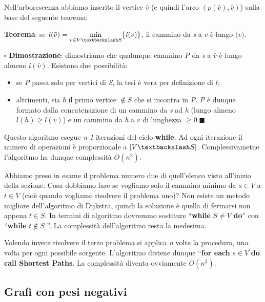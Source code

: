 \documentclass[11pt]{book}
\begin{document}
Nell'arborescenza abbiamo inserito il vertice $\bar{v}$ (e quindi
l'arco $(p(\bar{v}),\bar{v})$) sulla base del seguente teorema:


{\bf Teorema}: se $\mathit{l}(\bar{v}) = \min\limits_{v \in V
  \textbackslash S}\{ \mathit{l}(v) \}$, il cammino da {\em s} a
$\bar{v}$ \`e lungo $\mathit(\bar{v})$.

\vspace{11pt}
$\square$ {\bf Dimostrazione}: dimostriamo che qualunque cammino {\em
  P} da {\em s} a $\bar{v}$ \`e lungo almeno
$\mathit{l}(\bar{v})$. Esistono due possibilit\`a:

\begin{itemize}
\item se {\em P} passa solo per vertici di {\em S}, la tesi \`e vera
  per definizione di $\mathit{l}$;
\item altrimenti, sia {\em h} il primo vertice $\not \in S$ che si
  incontra in {\em P}. {\em P} \`e dunque formato dalla concatenazione
  di un cammino da {\em s} ad {\em h} (lungo almeno $\mathit{l}(h)
  \geq \mathit{l}({\bar{v}})$) e un cammino da {\em h} a $\bar{v}$ di
  lunghezza $\geq 0$.$\blacksquare$
\end{itemize}
\vspace{11pt}

Questo algoritmo esegue {\em n-1} iterazioni del ciclo {\bf while}. Ad
ogni iterazione il numero di operazioni \`e proporzionale a $|V
\textbackslash S|$. Complessivametne l'algoritmo ha dunque
complessit\`a $O(n^2)$.


Abbiamo preso in esame il problema numero due di quell'elenco visto
all'inizio della sezione. Cosa dobbiamo fare se vogliamo solo il
cammino minimo da $s \in V$ a $t \in V$ (cio\`e quando vogliamo
risolvere il problema uno)? Non esiste un metodo migliore
dell'algoritmo di Dijkstra, quindi la soluzione \`e quella di fermarsi
non appena $t \in S$. In termini di algoritmo dovremmo sostiture
\textquotedblleft {\bf while} $S \neq V$ {\bf do}\textquotedblright
con \textquotedblleft {\bf while} $t \not\in S$ \textquotedblright. La
complessit\`a dell'algoritmo resta la medesima.


Volendo invece risolvere il terzo problema si applica {\em n} volte la
procedura, una volta per ogni possibile sorgente. L'algoritmo diviene
dunque \textquotedblleft {\bf for each} $s \in V$ {\bf do call
  Shortest Paths}. La complessit\`a diventa ovviamente $O(n^3)$.


\subsection{Grafi con pesi negativi}
\end{document}
